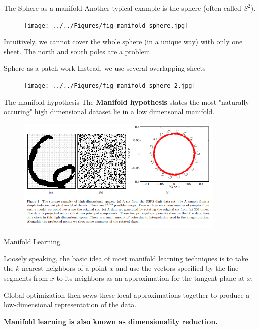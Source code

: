 \documentclass{beamer}
\begin{document}
\begin{frame}{The Sphere as a manifold}
	Another typical example is the sphere (often called $S^2$).
	
\begin{figure}[h]
	\centering
	\texttt{[image: ../../Figures/fig\_manifold\_sphere.jpg]}
\end{figure}	
Intuitively, we cannot cover the whole sphere (in a unique way) with only one sheet. The north and south poles are a problem. 

\end{frame}

\begin{frame}{Sphere as a patch work}
	Instead, we use several overlapping sheets 
\begin{figure}[h]
	\centering
	\texttt{[image: ../../Figures/fig\_manifold\_sphere\_2.jpg]}
\end{figure}		
	
	
\end{frame}




\begin{frame}{The manifold hypothesis}
	The \textbf{Manifold hypothesis} states the most "naturally occuring" high dimensional dataset lie in a low dimensonal manifold.
	
	\begin{figure}[h]
		\centering
		\includegraphics[width=10cm]{../../Figures/fig_manifold_lawrence.png}
	\end{figure}		
	
	
	
\end{frame}

\begin{frame}{Manifold Learning }
	
	Loosely speaking, the basic idea of most manifold learning techniques is to take the $k$-nearest neighbors of a point $x$ and use the vectors specified by the line segments from $x$ to its neighbors as an approximation for the tangent plane at $x$. 
	
	Global optimization then sews these local approximations together to produce a low-dimensional representation of the data. 
	
\begin{center}
\textbf{Manifold learning is also known as dimensionality reduction.} 
\end{center}
\end{frame}
\end{document}
